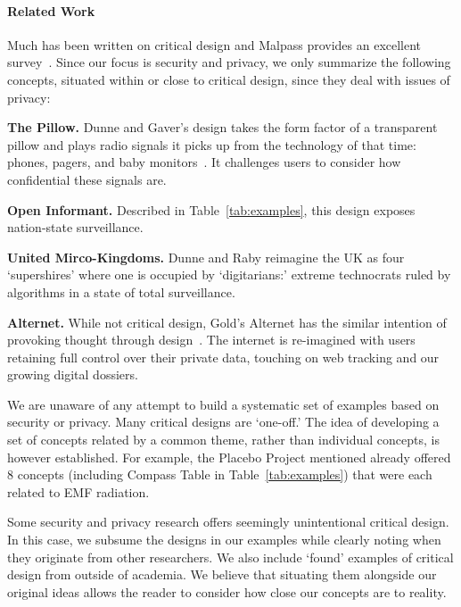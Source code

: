 \paragraph{Related Work}

Much has been written on critical design and Malpass provides an excellent survey~\cite{Mal17}. Since our focus is security and privacy, we only summarize the following concepts, situated within or close to critical design, since they deal with issues of privacy: 

\begin{compactlist}
\item \textbf{The Pillow.} Dunne and Gaver's design takes the form factor of a transparent pillow and plays radio signals it picks up from the technology of that time: \eg phones, pagers, and baby monitors~\cite{DuGa97}. It challenges users to consider how confidential these signals are.  
\item \textbf{Open Informant.} Described in Table~\ref{tab:examples}, this design exposes nation-state surveillance.
\item \textbf{United Mirco-Kingdoms.} Dunne and Raby reimagine the UK as four `supershires' where one is occupied by `digitarians:' extreme technocrats ruled by algorithms in a state of total surveillance.  
\item \textbf{Alternet.} While not critical design, Gold's Alternet has the similar intention of provoking thought through design~\cite{Gol14}. The internet is re-imagined with users retaining full control over their private data, touching on web tracking and our growing digital dossiers. 
\end{compactlist}

We are unaware of any attempt to build a systematic set of examples based on security or privacy. Many critical designs are `one-off.' The idea of developing a set of concepts related by a common theme, rather than individual concepts, is however established. For example, the Placebo Project mentioned already offered 8 concepts  (including Compass Table in Table~\ref{tab:examples}) that were each related to EMF radiation. 

Some security and privacy research offers seemingly unintentional critical design. In this case, we subsume the designs in our examples while clearly noting when they originate from other researchers. We also include `found' examples of critical design from outside of academia. We believe that situating them alongside our original ideas allows the reader to consider how close our concepts are to reality. 

